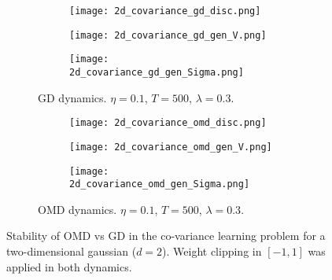 \begin{figure}[htpb]
    \centering
    \begin{subfigure}[b]{1\textwidth}
        \centering
    		\begin{subfigure}[b]{.3\textwidth}
    		\texttt{[image: 2d\_covariance\_gd\_disc.png]}
			\end{subfigure}        
    		\begin{subfigure}[b]{.3\textwidth}
    		\texttt{[image: 2d\_covariance\_gd\_gen\_V.png]}
			\end{subfigure}        
    		\begin{subfigure}[b]{.3\textwidth}
    		\texttt{[image: 2d\_covariance\_gd\_gen\_Sigma.png]}
			\end{subfigure}        
        \caption{GD dynamics. $\eta=0.1$, $T=500$, $\lambda=0.3$.}
    \end{subfigure}
    \begin{subfigure}[b]{1\textwidth}
        \centering
    		\begin{subfigure}[b]{.3\textwidth}
    		\texttt{[image: 2d\_covariance\_omd\_disc.png]}
			\end{subfigure}        
    		\begin{subfigure}[b]{.3\textwidth}
    		\texttt{[image: 2d\_covariance\_omd\_gen\_V.png]}
			\end{subfigure}        
    		\begin{subfigure}[b]{.3\textwidth}
    		\texttt{[image: 2d\_covariance\_omd\_gen\_Sigma.png]}
			\end{subfigure}        
        \caption{OMD dynamics. $\eta=0.1$, $T=500$, $\lambda=0.3$.}
    \end{subfigure}
    \caption{Stability of OMD vs GD in the co-variance learning problem for a two-dimensional gaussian ($d=2$). Weight clipping in $[-1,1]$ was applied in both dynamics.}\label{fig:covariance2d}
\end{figure}


